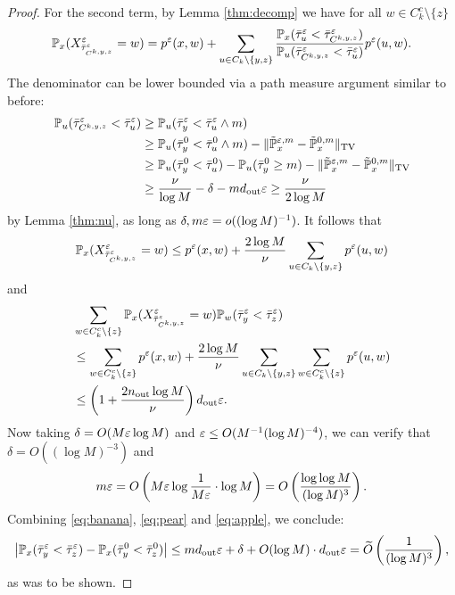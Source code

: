 \begin{proof}
For the second term, by Lemma \ref{thm:decomp} we have for all $w\in C_k^c\setminus\{z\}$
\begin{align*}
\mathbb{P}_x(X_{\bar{\tau}_{C^{k,y,z}}^\varepsilon}^\varepsilon = w) = p^\varepsilon(x,w) + \sum_{u\in C_k\setminus\{y,z\}} \frac{\mathbb{P}_x(\bar{\tau}_u^\varepsilon<\bar{\tau}_{C^{k,y,z}}^\varepsilon)}{\mathbb{P}_u(\bar{\tau}_{C^{k,y,z}}^\varepsilon<\bar{\tau}_u^\varepsilon)} p^\varepsilon(u,w).
\end{align*}
The denominator can be lower bounded via a path measure argument similar to before:
\begin{align}
\mathbb{P}_u(\bar{\tau}_{C^{k,y,z}}^\varepsilon<\bar{\tau}_u^\varepsilon) &\ge \mathbb{P}_u(\bar{\tau}_y^\varepsilon<\bar{\tau}_u^\varepsilon\wedge m)\nonumber \\
&\ge \mathbb{P}_u(\bar{\tau}_y^0<\bar{\tau}_u^0\wedge m) - \lVert\tilde{\mathbb{P}}_x^{\varepsilon,m} - \tilde{\mathbb{P}}_x^{0,m}\rVert_{\operatorname{TV}}\nonumber \\
&\ge \mathbb{P}_u(\bar{\tau}_y^0<\bar{\tau}_u^0) -\mathbb{P}_u(\bar{\tau}_y^0\ge m) - \lVert\tilde{\mathbb{P}}_x^{\varepsilon,m} - \tilde{\mathbb{P}}_x^{0,m}\rVert_{\operatorname{TV}}\nonumber \\
&\ge \frac{\nu}{\log M} - \delta - md_{\operatorname{out}}\varepsilon \ge \frac{\nu}{2\log M} \label{eq:kappa2}
\end{align}
by Lemma \ref{thm:nu}, as long as $\delta,m\varepsilon=o((\log M)^{-1})$. It follows that
\begin{align*}
\mathbb{P}_x(X_{\bar{\tau}_{C^{k,y,z}}^\varepsilon}^\varepsilon = w) \le p^\varepsilon(x,w) + \frac{2\log M}{\nu}\sum_{u\in C_k\setminus\{y,z\}} p^\varepsilon(u,w)
\end{align*}
and
\begin{align}
&\sum_{w\in C_k^c\setminus\{z\}} \mathbb{P}_x(X_{\bar{\tau}_{C^{k,y,z}}^\varepsilon}^\varepsilon = w) \mathbb{P}_w(\bar{\tau}_y^\varepsilon < \bar{\tau}_z^\varepsilon)\nonumber\\
&\le \sum_{w\in C_k^c\setminus\{z\}} p^\varepsilon(x,w) + \frac{2\log M}{\nu}\sum_{u\in C_k\setminus\{y,z\}} \sum_{w\in C_k^c\setminus\{z\}} p^\varepsilon(u,w)\nonumber \\
&\le \left(1+ \frac{2n_{\operatorname{out}}\log M}{\nu}\right) d_{\operatorname{out}}\varepsilon.\label{eq:apple}
\end{align}
Now taking $\delta = O(M\varepsilon\log M)$ and $\varepsilon\le O(M^{-1}(\log M)^{-4})$, we can verify that $\delta=O((\log M)^{-3})$ and
\begin{equation*}
m\varepsilon = O\left(M\varepsilon\log\frac{1}{M\varepsilon}\cdot\log M\right) = O\left(\frac{\log\log M}{(\log M)^3}\right).
\end{equation*}
Combining \eqref{eq:banana}, \eqref{eq:pear} and \eqref{eq:apple}, we conclude:
\begin{equation*}
\left\lvert\mathbb{P}_x(\bar{\tau}_y^\varepsilon < \bar{\tau}_z^\varepsilon) - \mathbb{P}_x(\bar{\tau}_y^0 < \bar{\tau}_z^0)\right\rvert \le md_{\operatorname{out}}
\varepsilon + \delta + O(\log M)\cdot d_{\operatorname{out}}\varepsilon = \widetilde{O}\left(\frac{1}{(\log M)^3}\right),
\end{equation*}
as was to be shown.
\end{proof}

